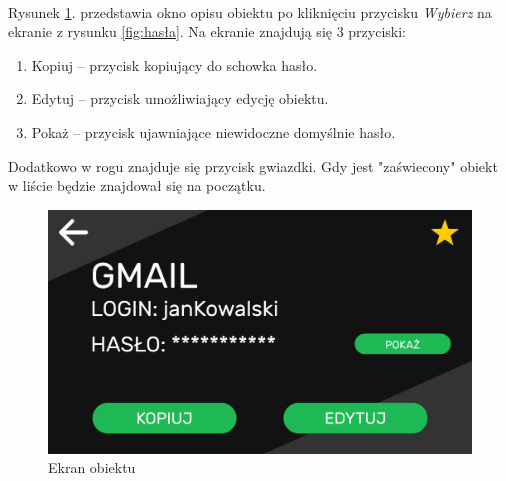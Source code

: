 \documentclass[a4paper]{article}
\begin{document}
\paragraph{}Rysunek \ref{fig:hasłaObiekt}. przedstawia okno opisu obiektu po kliknięciu przycisku \textit{Wybierz} na ekranie z rysunku \ref{fig:hasła}. Na ekranie znajdują się 3 przyciski:
\begin{enumerate}
    \item Kopiuj -- przycisk kopiujący do schowka hasło.
    \item Edytuj -- przycisk umożliwiający edycję obiektu.
    \item Pokaż -- przycisk ujawniające niewidoczne domyślnie hasło.
\end{enumerate}
Dodatkowo w rogu znajduje się przycisk gwiazdki. Gdy jest "zaświecony" obiekt w liście będzie znajdował się na początku.
\begin{figure}[H]
    \centering
    \includegraphics[width=1\textwidth]{img/ekran_obiektu.png}
    \caption{Ekran obiektu}
    \label{fig:hasłaObiekt}
\end{figure}

\newpage
\end{document}
